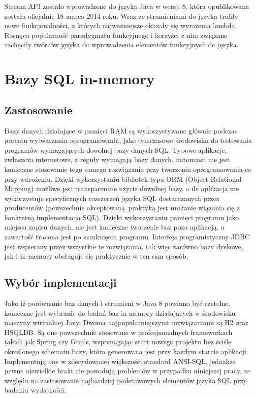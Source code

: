 \documentclass[12pt]{extarticle}
\begin{document}
    Stream API zostało wprowadzone do języka Java w wersji 8, która opublikowana została oficjalnie 18 marca 2014 roku. Wraz ze strumieniami do języka trafiły nowe funkcjonalności, z których najważniejsze okazały się wyrażenia lambda. Rosnąca popularność paradygmatu funkcyjnego i korzyści z nim związane zachęciły twórców języka do wprowadzenia elementów funkcyjnych do języka. 

\section{Bazy SQL in-memory}

\subsection{Zastosowanie}

      Bazy danych działające w pamięci RAM są wykorzystywane głównie podczas procesu wytwarzania oprogramowania, jako tymczasowe środowiska do testowania programów wymagających dowolnej bazy danych SQL. Typowe aplikacje, zwłaszcza internetowe, z reguły wymagają bazy danych, natomiast nie jest konieczne stosowanie tego samego rozwiązania przy tworzeniu oprogramowania co przy wdrożeniu. Dzięki wykorzystaniu bibliotek typu ORM (Object Relational Mapping) możliwe jest transparentne użycie dowolnej bazy, o ile aplikacja nie wykorzystuje specyficznych rozszerzeń języka SQL dostarczanych przez producentów (powszechnie akceptowaną praktyką jest unikanie wiązania się z konkretną implementacją SQL). Dzięki wykorzystaniu pamięci programu jako miejsca zapisu danych, nie jest konieczne tworzenie baz poza aplikacją, a zawartość tracona jest po zamknięciu programu.  Interfejs programistyczny JDBC jest wspierany przez wszystkie te rozwiązania, tak więc zarówno bazy dyskowe, jak i in-memory obsługuje się praktycznie w ten sam sposób. 

\subsection{Wybór implementacji}

    Jako iż porównanie baz danych i strumieni w Java 8 powinno być rzetelne, konieczne jest wybranie do badań baz in-memory działających w środowisku maszyny wirtualnej Javy. Dwoma najpopularniejszymi rozwiązaniami są H2 oraz HSQLDB. Są one powszechnie stosowane w profesjnonalnych frameworkach takich jak Spring czy Grails, wspomagając start nowego projektu bez ściśle określonego schematu bazy, która generowana jest przy każdym starcie aplikacji. Implementują one w zdecydowanej większości standard ANSI-SQL, jednakże pewne niewielkie braki nie powodują problemów w przypadku niniejszej pracy, ze względu na zastosowanie najbardziej podstawowych elementów języka SQL przy badaniu wydajności. 
\end{document}
